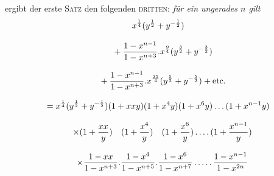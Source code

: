 ergibt der erste \textsc{Satz} den folgenden \textsc{dritten}: \textit{für ein ungerades $n$ gilt}
\[
\begin{gathered}
x^{\frac14}(y^{\frac12}+y^{-\frac12})
\\[8pt]\quad{}+\frac{1-x^{n-1}}{1-x^{n+3}}.x^{\frac94}(y^{\frac32}+y^{-\frac32})
\\[8pt]\quad{}+\frac{1-x^{n-1}}{1-x^{n+3}}.x^{\frac{25}4}(y^{\frac52}+y^{-\frac52})+\text{etc.}\\[8pt]
=x^{\frac14}(y^{\frac12}+y^{-\frac12})(1+xxy)(1+x^4y)(1+x^6y)\mathinner{.\,.\,.}(1+x^{n-1}y)\\[8pt]
\quad\times(1+\frac{xx}y)\quad(1+\frac{x^4}y)\quad(1+\frac{x^6}y)\mathinner{.\,.\,.\,.}(1+\frac{x^{n-1}}y)\\[8pt]
\quad\times\frac{1-xx}{1-x^{n+3}}.\frac{1-x^4}{1-x^{n+5}}.\frac{1-x^6}{1-x^{n+7}}\mathinner{.\,.\,.\,.\,.}\frac{1-x^{n-1}}{1-x^{2n}}
\end{gathered}
\]
\clearpage
\endgroup
